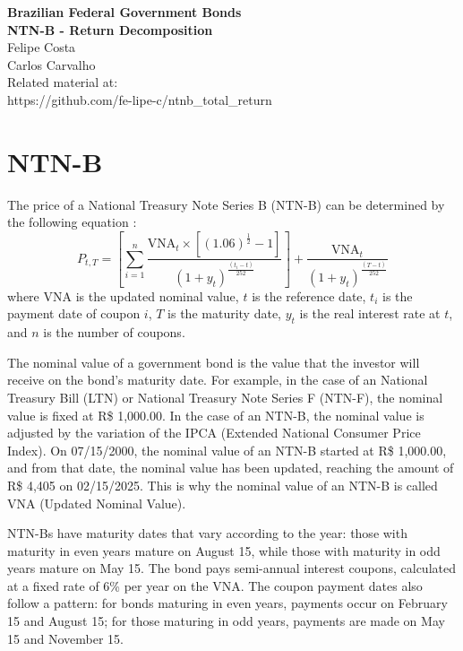\documentclass[10pt]{report}
\newcommand{\DOI}{https://github.com/fe-lipe-c/ntnb\_total\_return}
\begin{document}
\begin{titlepage}
	\begin{flushright}
		\LARGE{\textbf{Brazilian Federal Government Bonds}}\\
		\vfill
		\Huge{\textbf{NTN-B - Return Decomposition}}\\
		\vfill
		\large Felipe Costa\\
		\large Carlos Carvalho\\
		\vfill
		\normalsize Related material at:\\
		\DOI
		\vfill
	\end{flushright}
\end{titlepage}


\pagebreak

\section*{NTN-B}

The price of a National Treasury Note Series B (NTN-B) can be determined by the following equation \cite{jose_valentim}:
\begin{equation}
	P_{t,T} = \left[\sum_{i=1}^{n} \frac{\text{VNA}_{t} \times \left[(1.06)^{\frac{1}{2}}-1\right]}{(1+y_{t})^\frac{(t_{i}-t)}{252}}\right] + \frac{\text{VNA}_{t}}{(1+y_{t})^\frac{(T-t)}{252}}
\end{equation}
where VNA is the updated nominal value, $t$ is the reference date, $t_{i}$ is the payment date of coupon $i$, $T$ is the maturity date, $y_{t}$ is the real interest rate at $t$, and $n$ is the number of coupons.

The nominal value of a government bond is the value that the investor will receive on the bond's maturity date. For example, in the case of an National Treasury Bill (LTN) or National Treasury Note Series F (NTN-F), the nominal value is fixed at R\$ 1,000.00. In the case of an NTN-B, the nominal value is adjusted by the variation of the IPCA (Extended National Consumer Price Index). On 07/15/2000, the nominal value of an NTN-B started at R\$ 1,000.00, and from that date, the nominal value has been updated, reaching the amount of R\$ 4,405 on 02/15/2025. This is why the nominal value of an NTN-B is called VNA (Updated Nominal Value).

NTN-Bs have maturity dates that vary according to the year: those with maturity in even years mature on August 15, while those with maturity in odd years mature on May 15. The bond pays semi-annual interest coupons, calculated at a fixed rate of 6\% per year on the VNA. The coupon payment dates also follow a pattern: for bonds maturing in even years, payments occur on February 15 and August 15; for those maturing in odd years, payments are made on May 15 and November 15.
\end{document}
